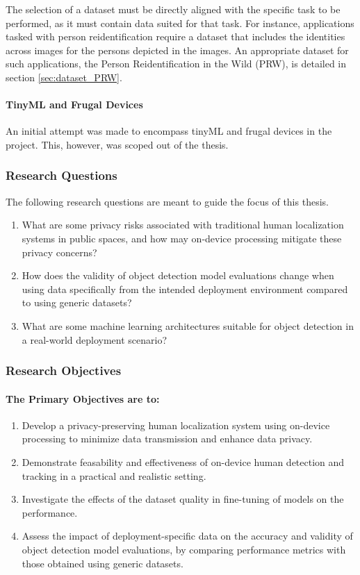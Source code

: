 The selection of a dataset must be directly aligned with the specific task to be performed, as it must contain data suited for that task. For instance, applications tasked with person reidentification require a dataset that includes the identities across images for the persons depicted in the images. An appropriate dataset for such applications, the Person Reidentification in the Wild (PRW), is detailed in section \ref{sec:dataset_PRW}.

\paragraph{TinyML and Frugal Devices}
\label{sec:scope_tinyML}
An initial attempt was made to encompass tinyML and frugal devices in the project. This, however, was scoped out of the thesis. 

\subsubsection{Research Questions}
\label{sec:research_questions}
The following research questions are meant to guide the focus of this thesis.
\begin{enumerate}
	\item What are some privacy risks associated with traditional human localization systems in public spaces, and how may on-device processing mitigate these privacy concerns?
	\item How does the validity of object detection model evaluations change when using data specifically from the intended deployment environment compared to using generic datasets?
	\item What are some machine learning architectures suitable for object detection in a real-world deployment scenario?
\end{enumerate}

\subsubsection{Research Objectives}
\label{sec:research_objectives}
\paragraph{The Primary Objectives are to:}
\begin{enumerate}
	\item Develop a privacy-preserving human localization system using on-device processing to minimize data transmission and enhance data privacy.
	\item Demonstrate feasability and effectiveness of on-device human detection and tracking in a practical and realistic setting.
	\item Investigate the effects of the dataset quality in fine-tuning of models on the performance.
	\item Assess the impact of deployment-specific data on the accuracy and validity of object detection model evaluations, by comparing performance metrics with those obtained using generic datasets.
\end{enumerate}

